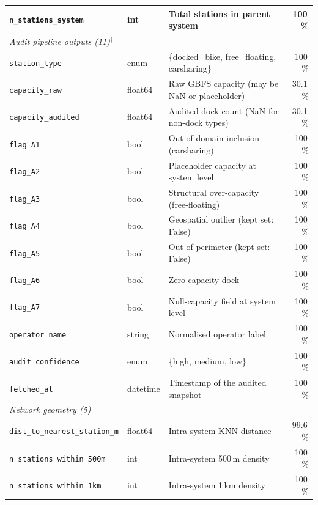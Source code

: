 \documentclass[11pt,a4paper]{article}
\begin{document}
\begin{table}[ht]
\begin{tabular}{@{}lllr@{}}
\quad\texttt{n\_stations\_system}& int     & Total stations in parent system            & 100\,\%\\
\midrule
\multicolumn{4}{l}{\textit{Audit pipeline outputs (11)$^\dag$}}\\
\quad\texttt{station\_type}      & enum    & \{docked\_bike, free\_floating, carsharing\} & 100\,\%\\
\quad\texttt{capacity\_raw}      & float64 & Raw GBFS capacity (may be NaN or placeholder) & 30.1\,\%\\
\quad\texttt{capacity\_audited}  & float64 & Audited dock count (NaN for non-dock types)   & 30.1\,\%\\
\quad\texttt{flag\_A1}            & bool    & Out-of-domain inclusion (carsharing)          & 100\,\%\\
\quad\texttt{flag\_A2}            & bool    & Placeholder capacity at system level          & 100\,\%\\
\quad\texttt{flag\_A3}            & bool    & Structural over-capacity (free-floating)      & 100\,\%\\
\quad\texttt{flag\_A4}            & bool    & Geospatial outlier (kept set: False)          & 100\,\%\\
\quad\texttt{flag\_A5}            & bool    & Out-of-perimeter (kept set: False)            & 100\,\%\\
\quad\texttt{flag\_A6}            & bool    & Zero-capacity dock                            & 100\,\%\\
\quad\texttt{flag\_A7}            & bool    & Null-capacity field at system level           & 100\,\%\\
\quad\texttt{operator\_name}     & string  & Normalised operator label                     & 100\,\%\\
\quad\texttt{audit\_confidence}  & enum    & \{high, medium, low\}                          & 100\,\%\\
\quad\texttt{fetched\_at}        & datetime& Timestamp of the audited snapshot              & 100\,\%\\
\midrule
\multicolumn{4}{l}{\textit{Network geometry (5)$^\dag$}}\\
\quad\texttt{dist\_to\_nearest\_station\_m}  & float64 & Intra-system KNN distance      & 99.6\,\%\\
\quad\texttt{n\_stations\_within\_500m}     & int     & Intra-system 500\,m density     & 100\,\%\\
\quad\texttt{n\_stations\_within\_1km}      & int     & Intra-system 1\,km density      & 100\,\%\\

\end{tabular}
\end{table}
\end{document}
